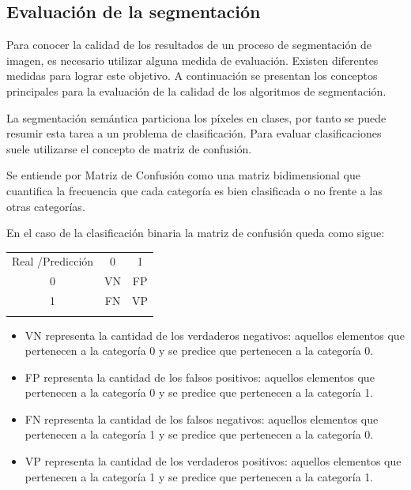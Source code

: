 \subsection{Evaluación de la segmentación}

Para conocer la calidad de los resultados de un proceso de segmentación de imagen, es necesario utilizar alguna medida de evaluación. Existen diferentes medidas para lograr este objetivo. A continuación se presentan los conceptos principales para la evaluación de la calidad de los algoritmos de segmentación.

La segmentación semántica particiona los píxeles en clases, por tanto se puede resumir esta tarea a un problema de clasificación. Para evaluar clasificaciones suele utilizarse el concepto de matriz de confusión.

\begin{definition}
	Se entiende por Matriz de Confusión como una matriz bidimensional que cuantifica la frecuencia que cada categoría es bien clasificada o no frente a las otras categorías.
\end{definition}

En el caso de la clasificación binaria la matriz de confusión queda como sigue:

\begin{table}[ht]
	\centering
	\begin{tabular}{|| c || c | c ||}
		\hhline{|=||=|=|}
		
		Real /Predicción & 0 & 1\\ \hhline{||=||=|=||}
		0 & VN & FP\\
		1 & FN & VP \\ \hhline{|=||=|=|}
	\end{tabular}
\end{table}

\begin{itemize}
	\item VN representa la cantidad  de los verdaderos negativos: aquellos elementos que pertenecen a la categoría 0 y se predice que pertenecen a la categoría 0.
	\item FP representa la cantidad  de  los falsos positivos: aquellos elementos que pertenecen a la categoría 0 y se predice que pertenecen a la categoría 1.
	\item FN representa la cantidad  de  los falsos negativos: aquellos elementos que pertenecen a la categoría 1 y se predice que pertenecen a la categoría 0.
	\item VP representa la cantidad  de  los verdaderos positivos: aquellos elementos que pertenecen a la categoría 1 y se predice que pertenecen a la categoría 1.
\end{itemize}

